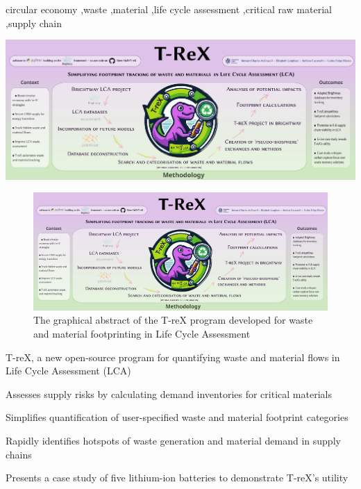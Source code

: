 \documentclass[a4paper,fleqn,longmktitle]{cas-dc}
\begin{document}
\begin{keywords} 
circular economy \sep waste \sep material \sep life cycle assessment \sep critical raw material \sep supply chain
\end{keywords}

\begin{graphicalabstract}
  \includegraphics{figs/T-reX_graphical-abstract.png}
\end{graphicalabstract}

\clearpage

\begin{figure}[h!]
	\centering
	\includegraphics[width=\textwidth]{figs/T-reX_graphical-abstract.png}
	\caption{The graphical abstract of the T-reX program developed for waste and material footprinting in Life Cycle Assessment}
	\label{fig:graphical_abstract}
\end{figure}

\clearpage


\restoregeometry %



\begin{highlights}
    \item T-reX, a new open-source program for quantifying waste and material flows in Life Cycle Assessment (LCA)
    \item Assesses supply risks by calculating demand inventories for critical materials
    \item Simplifies quantification of user-specified waste and material footprint categories
    \item Rapidly identifies hotspots of waste generation and material demand in supply chains
    \item Presents a case study of five lithium-ion batteries to demonstrate T-reX's utility
\end{highlights}
\end{document}
